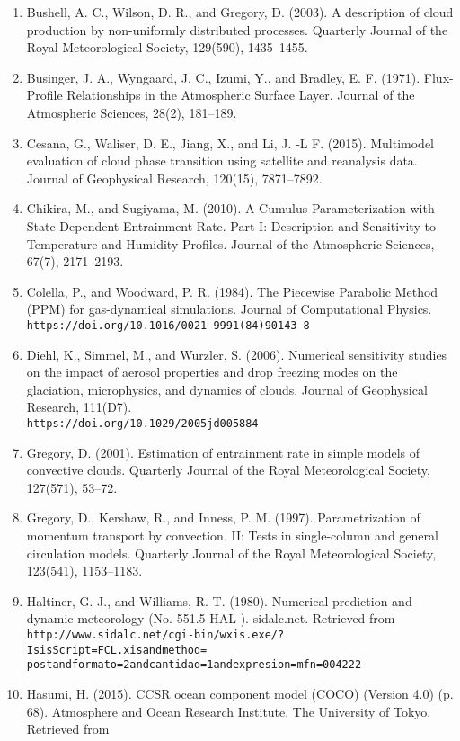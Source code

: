 \begin{enumerate}
\item Bushell, A. C., Wilson, D. R., and Gregory, D. (2003). A description of cloud production by non-uniformly distributed processes. Quarterly Journal of the Royal Meteorological Society, 129(590), 1435–1455.
\item Businger, J. A., Wyngaard, J. C., Izumi, Y., and Bradley, E. F. (1971). Flux-Profile Relationships in the Atmospheric Surface Layer. Journal of the Atmospheric Sciences, 28(2), 181–189.
\item Cesana, G., Waliser, D. E., Jiang, X., and Li, J. ‐L F. (2015). Multimodel evaluation of cloud phase transition using satellite and reanalysis data. Journal of Geophysical Research, 120(15), 7871–7892.
\item Chikira, M., and Sugiyama, M. (2010). A Cumulus Parameterization with State-Dependent Entrainment Rate. Part I: Description and Sensitivity to Temperature and Humidity Profiles. Journal of the Atmospheric Sciences, 67(7), 2171–2193.
\item Colella, P., and Woodward, P. R. (1984). The Piecewise Parabolic Method (PPM) for gas-dynamical simulations. Journal of Computational Physics. \\
\texttt{https://doi.org/10.1016/0021-9991(84)90143-8}
\item Diehl, K., Simmel, M., and Wurzler, S. (2006). Numerical sensitivity studies on the impact of aerosol properties and drop freezing modes on the glaciation, microphysics, and dynamics of clouds. Journal of Geophysical Research, 111(D7). \\
\texttt{https://doi.org/10.1029/2005jd005884}
\item Gregory, D. (2001). Estimation of entrainment rate in simple models of convective clouds. Quarterly Journal of the Royal Meteorological Society, 127(571), 53–72.
\item Gregory, D., Kershaw, R., and Inness, P. M. (1997). Parametrization of momentum transport by convection. II: Tests in single-column and general circulation models. Quarterly Journal of the Royal Meteorological Society, 123(541), 1153–1183.
\item Haltiner, G. J., and Williams, R. T. (1980). Numerical prediction and dynamic meteorology (No. 551.5 HAL ). sidalc.net. Retrieved from \\
\texttt{http://www.sidalc.net/cgi-bin/wxis.exe/?IsisScript=FCL.xisandmethod=\\
postandformato=2andcantidad=1andexpresion=mfn=004222}
\item Hasumi, H. (2015). CCSR ocean component model (COCO) (Version 4.0) (p. 68). Atmosphere and Ocean Research Institute, The University of Tokyo. Retrieved from \\

\end{enumerate}
